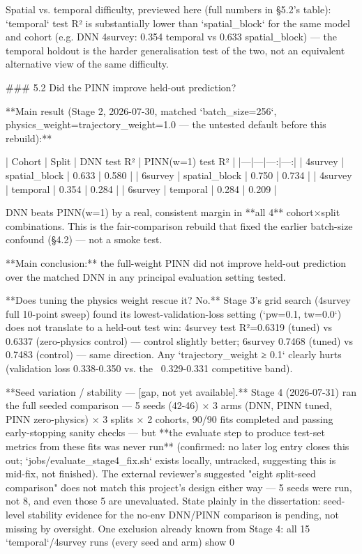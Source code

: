 Spatial vs. temporal difficulty, previewed here (full numbers in §5.2's table): `temporal` test R² is substantially lower than `spatial_block` for the same model and cohort (e.g. DNN 4survey: 0.354 temporal vs 0.633 spatial_block) — the temporal holdout is the harder generalisation test of the two, not an equivalent alternative view of the same difficulty.

### 5.2 Did the PINN improve held-out prediction?

**Main result (Stage 2, 2026-07-30, matched `batch_size=256`, physics_weight=trajectory_weight=1.0 — the untested default before this rebuild):**

| Cohort | Split | DNN test R² | PINN(w=1) test R² |
|---|---|---:|---:|
| 4survey | spatial_block | 0.633 | 0.580 |
| 6survey | spatial_block | 0.750 | 0.734 |
| 4survey | temporal | 0.354 | 0.284 |
| 6survey | temporal | 0.284 | 0.209 |

DNN beats PINN(w=1) by a real, consistent margin in **all 4** cohort×split combinations. This is the fair-comparison rebuild that fixed the earlier batch-size confound (§4.2) — not a smoke test.

**Main conclusion:** the full-weight PINN did not improve held-out prediction over the matched DNN in any principal evaluation setting tested.

**Does tuning the physics weight rescue it? No.** Stage 3's grid search (4survey full 10-point sweep) found its lowest-validation-loss setting (`pw=0.1, tw=0.0`) does not translate to a held-out test win: 4survey test R²=0.6319 (tuned) vs 0.6337 (zero-physics control) — control slightly better; 6survey 0.7468 (tuned) vs 0.7483 (control) — same direction. Any `trajectory_weight ≥ 0.1` clearly hurts (validation loss 0.338-0.350 vs. the ~0.329-0.331 competitive band).

**Seed variation / stability — [gap, not yet available].** Stage 4 (2026-07-31) ran the full seeded comparison — 5 seeds (42-46) × 3 arms (DNN, PINN tuned, PINN zero-physics) × 3 splits × 2 cohorts, 90/90 fits completed and passing early-stopping sanity checks — but **the evaluate step to produce test-set metrics from these fits was never run** (confirmed: no later log entry closes this out; `jobs/evaluate_stage4_fix.sh` exists locally, untracked, suggesting this is mid-fix, not finished). The external reviewer's suggested "eight split-seed comparison" does not match this project's design either way — 5 seeds were run, not 8, and even those 5 are unevaluated. State plainly in the dissertation: seed-level stability evidence for the no-env DNN/PINN comparison is pending, not missing by oversight.
One exclusion already known from Stage 4: all 15 `temporal`/4survey runs (every seed and arm) show 0%

